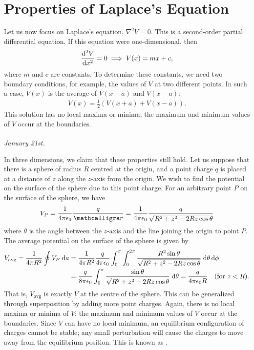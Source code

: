 \section{Properties of Laplace's Equation}
Let us now focus on Laplace's equation, $\nabla^{2} V = 0$. This is a second-order partial differential equation. If this equation were one-dimensional, then
\begin{align}
    \frac{\mathrm{d}^{2} V}{\mathrm{d}x^{2}} = 0 \implies V(x) = mx + c,
\end{align}
where $m$ and $c$ are constants. To determine these constants, we need two boundary conditions, for example, the values of $V$ at two different points. In such a case, $V(x)$ is the average of $V(x+a)$ and $V(x-a)$:
\begin{align}
    V(x) = \frac{1}{2} \left( V(x+a) + V(x-a) \right).
\end{align}
This solution has no local maxima or minima; the maximum and minimum values of $V$ occur at the boundaries.
\\ \\
\textit{January 21st.}

In three dimensions, we claim that these properties still hold. Let us suppose that there is a sphere of radius $R$ centred at the origin, and a point charge $q$ is placed at a distance of $z$ along the $z$-axis from the origin. We wish to find the potential on the surface of the sphere due to this point charge. For an arbitrary point $P$ on the surface of the sphere, we have
\begin{align}
    V_{P} = \frac{1}{4 \pi \epsilon_{0}} \frac{q}{\curs{r}} = \frac{1}{4 \pi \epsilon_{0}} \frac{q}{\sqrt{R^{2} + z^{2} - 2 R z \cos \theta}}
\end{align}
where $\theta$ is the angle between the $z$-axis and the line joining the origin to point $P$. The average potential on the surface of the sphere is given by
\begin{align}
    V_{\text{avg}} = \frac{1}{4 \pi R^{2}} \oint V_{P} \; \mathrm{d}a &= \frac{1}{4 \pi R^{2}} \frac{q}{4 \pi \epsilon_{0}} \int_{0}^{\pi} \int_{0}^{2\pi} \frac{R^{2} \sin \theta}{\sqrt{R^{2} + z^{2} - 2 R z \cos \theta}} \; \mathrm{d}\theta \, \mathrm{d}\phi \notag \\
    &= \frac{q}{8 \pi \epsilon_{0}} \int_{0}^{\pi} \frac{\sin \theta}{\sqrt{R^{2} + z^{2} - 2 R z \cos \theta}} \; \mathrm{d}\theta = \frac{q}{4 \pi \epsilon_{0} R} \quad \text{(for $z < R$)}.
\end{align}
That is, $V_{\text{avg}}$ is exactly $V$ at the centre of the sphere. This can be generalized through superposition by adding more point charges. Again, there is no local maxima or minima of $V$; the maximum and minimum values of $V$ occur at the boundaries. Since $V$ can have no local minimum, an equilibrium configuration of charges cannot be stable; any small perturbation will cause the charges to move away from the equilibrium position. This is known as .

